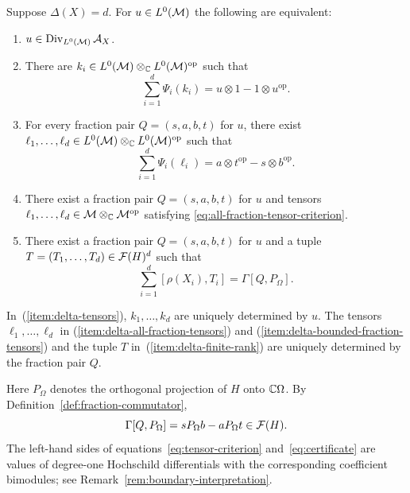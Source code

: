 \begin{theorem}\label{thm:delta}
Suppose $\Delta(X)=d$.
For $u\in L^0(\mathcal M)$ the following are equivalent:
\begin{enumerate}
\item $u\in\operatorname{Div}_{L^0(\mathcal M)}\mathcal A_X$.
\item\label{item:delta-tensors} There are $k_i\in L^0(\mathcal M)\otimes_{\mathbb C}L^0(\mathcal M)^{\mathrm{op}}$ such that
\begin{equation}
 \sum_{i=1}^d\Psi_i(k_i)=u\otimes1-1\otimes u^{\mathrm{op}}.
 \label{eq:tensor-criterion}
\end{equation}
\item\label{item:delta-all-fraction-tensors}
For every fraction pair $Q=(s,a,b,t)$ for $u$, there exist $\ell_1,\ldots,\ell_d\in L^0(\mathcal M)\otimes_{\mathbb C}L^0(\mathcal M)^{\mathrm{op}}$ such that
\begin{equation}\label{eq:all-fraction-tensor-criterion}
 \sum_{i=1}^d\Psi_i(\ell_i)
 =a\otimes t^{\mathrm{op}}-s\otimes b^{\mathrm{op}}.
\end{equation}
\item\label{item:delta-bounded-fraction-tensors}
There exist a fraction pair $Q=(s,a,b,t)$ for $u$ and tensors $\ell_1,\ldots,\ell_d\in\mathcal M\otimes_{\mathbb C}\mathcal M^{\mathrm{op}}$ satisfying \eqref{eq:all-fraction-tensor-criterion}.
\item\label{item:delta-finite-rank} There exist a fraction pair $Q=(s,a,b,t)$ for $u$ and a tuple $T=(T_1,\ldots,T_d)\in\mathcal F(H)^d$ such that
\begin{equation}
 \sum_{i=1}^d[\rho(X_i),T_i]=\Gamma[Q,P_\Omega].
 \label{eq:certificate}
\end{equation}
\end{enumerate}
In~\textup{(\ref{item:delta-tensors})}, $k_1,\ldots,k_d$ are uniquely determined by $u$.
The tensors $\ell_1,\ldots,\ell_d$ in \textup{(\ref{item:delta-all-fraction-tensors})} and \textup{(\ref{item:delta-bounded-fraction-tensors})} and the tuple $T$ in~\textup{(\ref{item:delta-finite-rank})} are uniquely determined by the fraction pair $Q$.
\end{theorem}

Here $P_\Omega$ denotes the orthogonal projection of $H$ onto $\mathbb C\Omega$.
By Definition~\ref{def:fraction-commutator},
\[
\Gamma[Q,P_\Omega]=sP_\Omega b-aP_\Omega t\in\mathcal F(H).
\]
The left-hand sides of equations~\eqref{eq:tensor-criterion} and~\eqref{eq:certificate} are values of degree-one Hochschild differentials with the corresponding coefficient bimodules; see Remark~\ref{rem:boundary-interpretation}.

